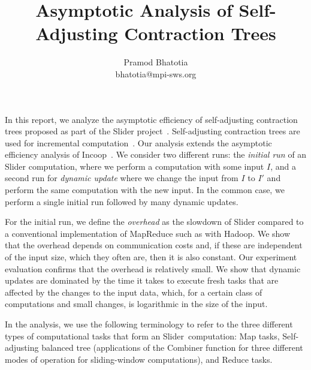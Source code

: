 \documentclass{article}
\newcommand{\projecttitle}{Slider\xspace}
\begin{document}
\date{}
\title{Asymptotic Analysis of Self-Adjusting Contraction Trees} 
\author{Pramod Bhatotia\\bhatotia@mpi-sws.org}





\maketitle
\thispagestyle{empty}
\pagestyle{empty}



	
In this report, we analyze the asymptotic efficiency of self-adjusting contraction trees proposed as part of the \projecttitle project~\cite{slider, contraction-tree}.  Self-adjusting contraction trees are used for incremental computation~\cite{Bhatotia15,  ithreads, shredder, incApprox}. Our analysis extends the asymptotic efficiency analysis of Incoop~\cite{incoop-hotcloud, incoop}. We consider two
different runs: the {\em initial run} of an \projecttitle computation,
where we perform a computation with some input $I$, and a second
run for {\em dynamic update} where we change the input from $I$ to
$I'$ and perform the same computation with the new input.  In the
common case, we perform a single initial run followed by many dynamic
updates.


For the initial run, we define the {\em overhead} as the slowdown of
\projecttitle compared to a conventional implementation of MapReduce
such as with Hadoop.  We show that the overhead depends on
communication costs and, if these are independent of
the input size, which they often are, then it is also constant.  Our
experiment evaluation confirms that the overhead is relatively
small.  We show that dynamic updates are dominated by the time it
takes to execute fresh tasks that are affected by the changes to the
input data, which, for a certain class of computations and small
changes, is logarithmic in the size of the input.

In the analysis, we use the following terminology to refer to the
three different types of computational tasks that form an
\projecttitle~computation: Map tasks, Self-adjusting balanced tree (applications
of the Combiner function for three different modes of operation for sliding-window computations), and Reduce tasks.
\end{document}
